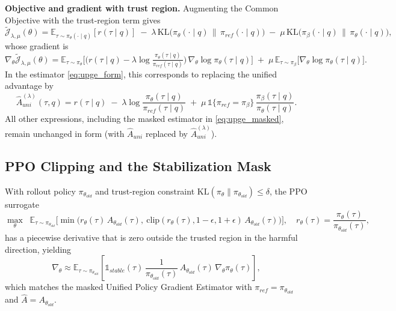 \documentclass{article} %
\newcommand{\0}{\mathbb{0}}
\newcommand{\1}{\mathbb{1}}
\newcommand{\E}{\mathbb{E}}
\begin{document}
\medskip
\noindent\textbf{Objective and gradient with trust region.}
Augmenting the Common Objective with the trust-region term gives
\[
\widetilde{\mathcal{J}}_{\lambda,\mu}(\theta)
=
\E_{\tau\sim \pi_\theta(\cdot\mid q)}[r(\tau\mid q)]
\;-\;
\lambda\,\mathrm{KL}\!\big(\pi_\theta(\cdot\mid q)\,\|\,\pi_{ref}(\cdot\mid q)\big)
\;-\;
\mu\,\mathrm{KL}\!\big(\pi_\beta(\cdot\mid q)\,\|\,\pi_\theta(\cdot\mid q)\big),
\]
whose gradient is
\[
\nabla_\theta \widetilde{\mathcal{J}}_{\lambda,\mu}(\theta)
=
\E_{\tau\sim \pi_\theta}\!\Big[\big(r(\tau\mid q)-\lambda \log\tfrac{\pi_\theta(\tau\mid q)}{\pi_{ref}(\tau\mid q)}\big)\,\nabla_\theta \log \pi_\theta(\tau\mid q)\Big]
\;+\;
\mu\,\E_{\tau\sim \pi_\beta}\!\big[\nabla_\theta \log \pi_\theta(\tau\mid q)\big].
\]
In the estimator \eqref{eq:upge_form}, this corresponds to replacing the unified advantage by
\[
\widehat{A}_{uni}^{(\lambda)}(\tau,q)
=
r(\tau\mid q)
\;-\;\lambda \log \frac{\pi_\theta(\tau\mid q)}{\pi_{ref}(\tau\mid q)}
\;+\;
\mu\,\mathbb{1}\{\pi_{ref}=\pi_\beta\}\,\frac{\pi_\beta(\tau\mid q)}{\pi_\theta(\tau\mid q)}.
\]
All other expressions, including the masked estimator in \eqref{eq:upge_masked}, remain unchanged in form (with $\widehat{A}_{uni}$ replaced by $\widehat{A}_{uni}^{(\lambda)}$).

\subsection{PPO Clipping and the Stabilization Mask}
\label{app:ppo-mask-subsec}

With rollout policy $\pi_{\theta_{old}}$ and trust-region constraint $\mathrm{KL}(\pi_\theta\|\pi_{\theta_{old}})\le \delta$, the PPO surrogate
\[
\max_{\theta}\;\;
\E_{\tau\sim \pi_{\theta_{old}}}\Big[\min\big(r_\theta(\tau)\,A_{\theta_{old}}(\tau),\ \mathrm{clip}(r_\theta(\tau),1-\epsilon,1+\epsilon)\,A_{\theta_{old}}(\tau)\big)\Big],
\quad
r_\theta(\tau)=\frac{\pi_\theta(\tau)}{\pi_{\theta_{old}}(\tau)},
\]
has a piecewise derivative that is zero outside the trusted region in the harmful direction, yielding
\begin{equation}
\label{eq:ppo_mask_app}
\nabla_\theta
\approx
\E_{\tau\sim \pi_{\theta_{old}}}
\!\left[
\mathbb{1}_{stable}(\tau)\,
\frac{1}{\pi_{\theta_{old}}(\tau)}\,
A_{\theta_{old}}(\tau)\,
\nabla_\theta \pi_\theta(\tau)
\right],
\end{equation}
which matches the masked Unified Policy Gradient Estimator with $\pi_{ref}=\pi_{\theta_{old}}$ and $\widehat{A}=A_{\theta_{old}}$.





\end{document}
